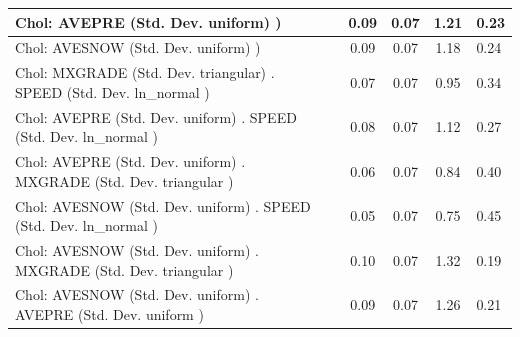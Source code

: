 \begin{table}
\begin{center}
\begin{tabular}{|l|l|c|c|c|l|}
			\hline
			 Chol: AVEPRE (Std. Dev. uniform) ) &  & 0.09 & 0.07 & 1.21 & 0.23 \\
			\hline
			 Chol: AVESNOW (Std. Dev. uniform) ) &  & 0.09 & 0.07 & 1.18 & 0.24 \\
			\hline
			 Chol: MXGRADE (Std. Dev. triangular) . SPEED (Std. Dev.   ln_normal ) &  & 0.07 & 0.07 & 0.95 & 0.34 \\
			\hline
			 Chol: AVEPRE (Std. Dev. uniform) . SPEED (Std. Dev.   ln_normal ) &  & 0.08 & 0.07 & 1.12 & 0.27 \\
			\hline
			 Chol: AVEPRE (Std. Dev. uniform) . MXGRADE (Std. Dev.   triangular ) &  & 0.06 & 0.07 & 0.84 & 0.40 \\
			\hline
			 Chol: AVESNOW (Std. Dev. uniform) . SPEED (Std. Dev.   ln_normal ) &  & 0.05 & 0.07 & 0.75 & 0.45 \\
			\hline
			 Chol: AVESNOW (Std. Dev. uniform) . MXGRADE (Std. Dev.   triangular ) &  & 0.10 & 0.07 & 1.32 & 0.19 \\
			\hline
			 Chol: AVESNOW (Std. Dev. uniform) . AVEPRE (Std. Dev.   uniform ) &  & 0.09 & 0.07 & 1.26 & 0.21 \\
			\hline
		\end{tabular}
	\end{center}
\end{table}
